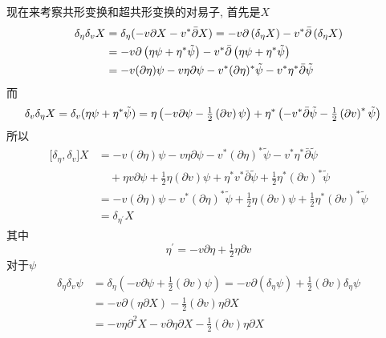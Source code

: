 \begin{tcolorbox}[breakable]
现在来考察共形变换和超共形变换的对易子, 首先是$X$%
\begin{align*}
\delta _{\eta }\delta _{v}X &=\delta _{\eta }(-v\partial X-v^{\ast }\bar{%
\partial}X)=-v\partial \left( \delta _{\eta }X\right) -v^{\ast }\bar{\partial%
}\left( \delta _{\eta }X\right)  \\
&=-v\partial \left( \eta \psi +\eta ^{\ast }\tilde{\psi}\right) -v^{\ast }%
\bar{\partial}\left( \eta \psi +\eta ^{\ast }\tilde{\psi}\right)  \\
&=-v(\partial \eta )\psi -v\eta \partial \psi -v^{\ast }(\partial \eta
)^{\ast }\tilde{\psi}-v^{\ast }\eta ^{\ast }\bar{\partial}\tilde{\psi}
\end{align*}%
而
\begin{align*}
\delta _{v}\delta _{\eta }X &=\delta _{v}(\eta \psi +\eta ^{\ast }\tilde{%
\psi})=\eta \left( -v\partial \psi -\tfrac{1}{2}\left( \partial v\right) \psi
\right) +\eta ^{\ast }\left( -v^{\ast }\bar{\partial}\tilde{\psi}-\tfrac{1}{2}%
\left( \partial v\right) ^{\ast }\tilde{\psi}\right)
\end{align*}%
所以
\begin{align*}
\lbrack \delta _{\eta },\delta _{v}]X &=-v(\partial \eta )\psi -v\eta
\partial \psi -v^{\ast }(\partial \eta )^{\ast }\tilde{\psi}-v^{\ast }\eta
^{\ast }\bar{\partial}\tilde{\psi} \\
&\quad+\eta v\partial \psi +\tfrac{1}{2}\eta \left( \partial v\right) \psi +\eta
^{\ast }v^{\ast }\bar{\partial}\tilde{\psi}+\tfrac{1}{2}\eta ^{\ast }\left(
\partial v\right) ^{\ast }\tilde{\psi} \\
&=-v(\partial \eta )\psi -v^{\ast }(\partial \eta )^{\ast }\tilde{\psi}+%
\tfrac{1}{2}\eta \left( \partial v\right) \psi +\tfrac{1}{2}\eta ^{\ast
}\left( \partial v\right) ^{\ast }\tilde{\psi} \\
&=\delta _{\eta ^{\prime }}X
\end{align*}%
其中\[
\eta ^{\prime }=-v\partial \eta +\tfrac{1}{2}\eta \partial v
\]%
对于$\psi $%
\begin{align*}
\delta _{\eta }\delta _{v}\psi  &=\delta _{\eta }\left( -v\partial \psi +%
\tfrac{1}{2}(\partial v)\psi \right) =-v\partial \left( \delta _{\eta }\psi
\right) +\tfrac{1}{2}(\partial v)\delta _{\eta }\psi  \\
&=-v\partial \left( \eta \partial X\right) -\frac{1}{2}(\partial v)\eta
\partial X \\
&=-v\eta \partial ^{2}X-v\partial \eta \partial X-\tfrac{1}{2}(\partial
v)\eta \partial X
\end{align*}%

\end{tcolorbox}
